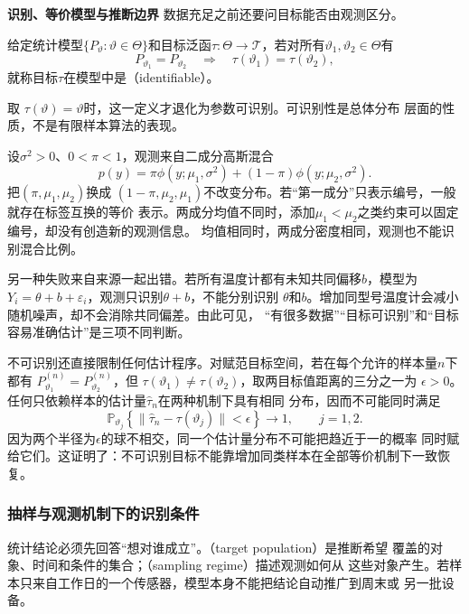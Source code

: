 \par\medskip\noindent\textbf{识别、等价模型与推断边界}\quad
数据充足之前还要问目标能否由观测区分。
\begin{definition}[目标可识别性]
  \label{def:statistics-identifiability}
  给定统计模型\(\{P_\vartheta:\vartheta\in\Theta\}\)和目标泛函\(\tau:\Theta\to\mathcal T\)，若对所有\(\vartheta_1,\vartheta_2\in\Theta\)有
\[
  P_{\vartheta_1}=P_{\vartheta_2}
  \quad\Longrightarrow\quad
  \tau(\vartheta_1)=\tau(\vartheta_2),
\]
就称目标\(\tau\)在模型中是（identifiable）。
\end{definition}
取
\(\tau(\vartheta)=\vartheta\)时，这一定义才退化为参数可识别。可识别性是总体分布
层面的性质，不是有限样本算法的表现。

\begin{example}[混合成分的标签交换]
\label{ex:statistics-mixture-label-switching}
设\(\sigma^2>0\)、\(0<\pi<1\)，观测来自二成分高斯混合
\[
  p(y)=\pi\phi(y;\mu_1,\sigma^2)
       +(1-\pi)\phi(y;\mu_2,\sigma^2).
\]
把\((\pi,\mu_1,\mu_2)\)换成
\((1-\pi,\mu_2,\mu_1)\)不改变分布。若“第一成分”只表示编号，一般就存在标签互换的等价
表示。两成分均值不同时，添加\(\mu_1<\mu_2\)之类约束可以固定编号，却没有创造新的观测信息。
均值相同时，两成分密度相同，观测也不能识别混合比例。
\end{example}

另一种失败来自来源一起出错。若所有温度计都有未知共同偏移\(b\)，模型为
\(Y_i=\theta+b+\varepsilon_i\)，观测只识别\(\theta+b\)，不能分别识别
\(\theta\)和\(b\)。增加同型号温度计会减小随机噪声，却不会消除共同偏差。由此可见，
“有很多数据”“目标可识别”和“目标容易准确估计”是三项不同判断。

不可识别还直接限制任何估计程序。对赋范目标空间，若在每个允许的样本量\(n\)下都有
\(P_{\vartheta_1}^{(n)}=P_{\vartheta_2}^{(n)}\)，但
\(\tau(\vartheta_1)\neq\tau(\vartheta_2)\)，取两目标值距离的三分之一为
\(\epsilon>0\)。任何只依赖样本的估计量\(\widehat\tau_n\)在两种机制下具有相同
分布，因而不可能同时满足
\[
  \mathbb{P}_{\vartheta_j}
  \left\{\lVert\widehat\tau_n-\tau(\vartheta_j)\rVert<\epsilon\right\}
  \longrightarrow1,\qquad j=1,2.
\]
因为两个半径为\(\epsilon\)的球不相交，同一个估计量分布不可能把趋近于一的概率
同时赋给它们。这证明了：不可识别目标不能靠增加同类样本在全部等价机制下一致恢复。

\subsubsection{抽样与观测机制下的识别条件}
\label{sec:statistics-sampling-population}
\label{sec:statistics-missingness-observation}
统计结论必须先回答“想对谁成立”。（target population）是推断希望
覆盖的对象、时间和条件的集合；（sampling regime）描述观测如何从
这些对象产生。若样本只来自工作日的一个传感器，模型本身不能把结论自动推广到周末或
另一批设备。

